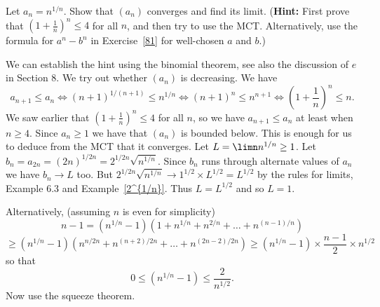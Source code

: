 \documentclass[11pt,dvipsnames]{book}
\numberwithin{figure}{section} %
\numberwithin{table}{section} %
\begin{document}
\begin{exercise}
Let $a_n = n^{1/n}$. Show that $(a_n)$ converges and find its limit. ({\bf Hint:} First prove that $(1+ \frac{1}{n})^n \leq 4$ for all $n$, and then try to use the MCT. Alternatively, use the formula for $a^n - b^n$ in Exercise~\ref{81} for well-chosen $a$ and $b$.)

\begin{solution}
We can establish the hint using the binomial theorem, see also the discussion of $e$ in Section 8. We try out whether $(a_n)$ is decreasing. We have
\[ a_{n+1} \leq a_n \iff (n+1)^{1/(n+1)} \leq n^{1/n}
\iff (n+1)^n \leq n^{n+1} \iff \left(1 + \frac{1}{n}\right)^n \leq n.
\]
We saw earlier that $\left(1 + \frac{1}{n}\right)^n \leq 4$ for all $n$, so we have $a_{n+1} \leq a_n$ at least when $n \geq 4$. Since $a_n \geq 1$ we have that $(a_n)$
is bounded below. This is enough for us to deduce from the MCT that it converges. Let $L = \limn n^{1/n} \geq 1$. Let $b_n = a_{2n} = (2n)^{1/2n} = 2^{1/2n} \sqrt{n^{1/n}}$. Since $b_n$ runs through alternate values of $a_n$ we have $b_n \to L$ too.
But $2^{1/2n} \sqrt{n^{1/n}} \to 1^{1/2} \times L^{1/2} = L^{1/2}$ by the rules for limits, Example 6.3 and Example~\ref{2^{1/n}}. Thus $L = L^{1/2}$ and so $L = 1$.

Alternatively, (assuming $n$ is even for simplicity)
\[ n - 1 = (n^{1/n} - 1)(1 + n^{1/n} + n^{2/n} + \dots + n^{(n-1)/n}) \]
\[\geq  (n^{1/n} - 1)(n^{n/2n} + n^{(n+2)/2n} + \dots + n^{(2n-2)/2n}) \geq (n^{1/n} - 1) \times \frac{n-1}{2} \times n^{1/2}\] so that
\[ 0 \leq  (n^{1/n} - 1) \leq \frac{2}{n^{1/2}}.\]
Now use the squeeze theorem.
\end{solution}
\end{exercise}
\end{document}
